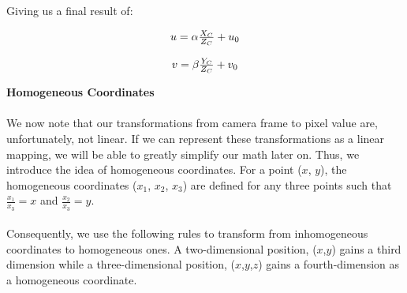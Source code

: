 \documentclass[]{article}
\begin{document}
Giving us a final result of:

\begin{center}
\begin{equation}
\begin{tabular}{c}
  $u = \alpha\frac{X_C}{Z_C} + u_0$\\
  \\
  $v = \beta\frac{Y_C}{Z_C} + v_0$
\end{tabular}
\end{equation}
\end{center}

\textbf{Homogeneous Coordinates}\\\\
We now note that our transformations from camera frame to pixel value are, unfortunately, not linear. If we can represent these transformations as a linear mapping, we will be able to greatly simplify our math later on. Thus, we introduce the idea of homogeneous coordinates. For a point ($x$, $y$), the homogeneous coordinates ($x_1$, $x_2$, $x_3$) are defined for any three points such that  $\frac{x_1}{x_3} = x$ and $\frac{x_2}{x_3} = y$. \\\\ Consequently, we use the following rules to transform from inhomogeneous coordinates to homogeneous ones. A two-dimensional position, ($x$,$y$) gains a third dimension while a three-dimensional position, ($x$,$y$,$z$) gains a fourth-dimension as a homogeneous coordinate.\\\\
\end{document}
